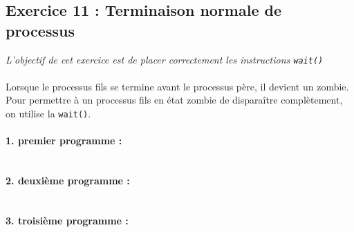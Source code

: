 \subsection{Exercice 11 : Terminaison normale de processus}
\textit{L’objectif de cet exercice est de placer correctement les instructions \texttt{wait()}}
\\\\
Lorsque le processus fils se termine avant le processus père, il devient un zombie. Pour permettre à un processus fils en état zombie de disparaître complètement, on utilise la \texttt{wait()}.

\paragraph{1. premier programme :}
\inputminted[linenos,firstline=8,lastline=14]{cpp}{../sources/cpp/TP5-6/ex11-programme1.c}

\paragraph{2. deuxième programme :}
\inputminted[linenos,firstline=8,lastline=17]{cpp}{../sources/cpp/TP5-6/ex11-programme2.c}

\paragraph{3. troisième programme :}
\inputminted[linenos,firstline=8,lastline=22]{cpp}{../sources/cpp/TP5-6/ex11-programme3.c}

